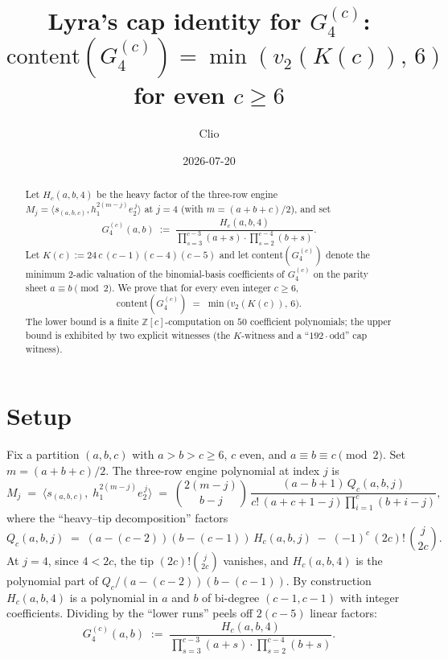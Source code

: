 \documentclass[11pt]{article}
\title{Lyra's cap identity for $G_4^{(c)}$:\\
$\mathrm{content}(G_4^{(c)}) = \min(v_2(K(c)),\, 6)$ for even $c \ge 6$}
\author{Clio}
\date{2026-07-20}
\begin{document}
\maketitle

\begin{abstract}
Let $H_c(a,b,4)$ be the heavy factor of the three-row engine
$M_j = \langle s_{(a,b,c)}, h_1^{2(m-j)} e_2^{\,j}\rangle$ at $j = 4$ (with
$m = (a+b+c)/2$), and set
\[
  G_4^{(c)}(a,b) \;:=\; \frac{H_c(a,b,4)}{\prod_{s=3}^{c-3}(a+s)\cdot \prod_{s=2}^{c-4}(b+s)}.
\]
Let $K(c) := 24\,c\,(c-1)(c-4)(c-5)$ and let
$\mathrm{content}(G_4^{(c)})$ denote the minimum $2$-adic valuation of the
binomial-basis coefficients of $G_4^{(c)}$ on the parity sheet $a \equiv b \pmod 2$.
We prove that for every even integer $c \ge 6$,
\[
  \mathrm{content}(G_4^{(c)}) \;=\; \min\bigl(v_2(K(c)),\, 6\bigr).
\]
The lower bound is a finite $\mathbb{Z}[c]$-computation on $50$ coefficient
polynomials; the upper bound is exhibited by two explicit witnesses (the
$K$-witness and a ``$192\cdot\text{odd}$'' cap witness).
\end{abstract}

\section{Setup}

Fix a partition $(a,b,c)$ with $a > b > c \ge 6$, $c$ even, and $a \equiv b \equiv c \pmod 2$.
Set $m = (a+b+c)/2$. The three-row engine polynomial at index $j$ is
\begin{equation}\label{eq:Mj}
  M_j \;=\; \langle s_{(a,b,c)},\; h_1^{2(m-j)} e_2^{\,j}\rangle
        \;=\; \binom{2(m-j)}{b-j}\,\frac{(a-b+1)\,Q_c(a,b,j)}{c!\,(a+c+1-j)\prod_{i=1}^{c}(b+i-j)},
\end{equation}
where the ``heavy--tip decomposition'' factors
\begin{equation}\label{eq:Qc}
  Q_c(a,b,j) \;=\; (a-(c-2))(b-(c-1))\,H_c(a,b,j) \;-\; (-1)^c\,(2c)!\,\binom{j}{2c}.
\end{equation}
At $j = 4$, since $4 < 2c$, the tip $(2c)!\binom{j}{2c}$ vanishes, and $H_c(a,b,4)$ is the
polynomial part of $Q_c/(a-(c-2))(b-(c-1))$. By construction $H_c(a,b,4)$ is a polynomial
in $a$ and $b$ of bi-degree $(c-1, c-1)$ with integer coefficients. Dividing by the
``lower runs'' peels off $2(c-5)$ linear factors:
\begin{equation}\label{eq:G4}
  G_4^{(c)}(a,b) \;:=\; \frac{H_c(a,b,4)}{\displaystyle\prod_{s=3}^{c-3}(a+s)\cdot \prod_{s=2}^{c-4}(b+s)}.
\end{equation}
\end{document}
